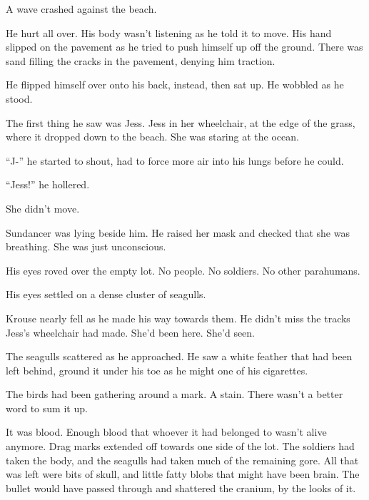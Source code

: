 A wave crashed against the beach.



He hurt all over.  His body wasn't listening as he told it to move.  His hand slipped on the pavement as he tried to push himself up off the ground.  There was sand filling the cracks in the pavement, denying him traction.



He flipped himself over onto his back, instead, then sat up.  He wobbled as he stood.



The first thing he saw was Jess.  Jess in her wheelchair, at the edge of the grass, where it dropped down to the beach.  She was staring at the ocean.



``J-'' he started to shout, had to force more air into his lungs before he could.



``Jess!'' he hollered.



She didn't move.



Sundancer was lying beside him.  He raised her mask and checked that she was breathing.  She was just unconscious.



His eyes roved over the empty lot.  No people.  No soldiers.  No other parahumans.



His eyes settled on a dense cluster of seagulls.



Krouse nearly fell as he made his way towards them.  He didn't miss the tracks Jess's wheelchair had made.  She'd been here.  She'd seen.



The seagulls scattered as he approached.  He saw a white feather that had been left behind, ground it under his toe as he might one of his cigarettes.



The birds had been gathering around a mark.  A stain.  There wasn't a better word to sum it up.



It was blood.  Enough blood that whoever it had belonged to wasn't alive anymore.  Drag marks extended off towards one side of the lot.  The soldiers had taken the body, and the seagulls had taken much of the remaining gore.  All that was left were bits of skull, and little fatty blobs that might have been brain.  The bullet would have passed through and shattered the cranium, by the looks of it.



